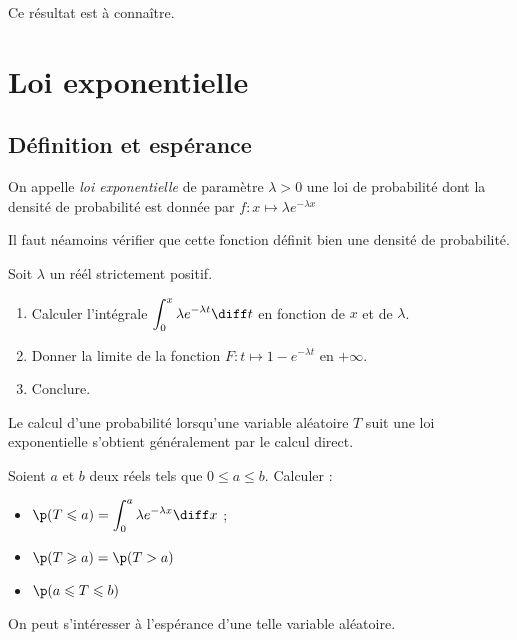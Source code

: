 \documentclass[12pt,a4paper,french]{article}
\begin{document}
Ce résultat est à connaître.

\pagebreak

\section{Loi exponentielle}

\subsection{Définition et espérance}

\begin{definition}
  On appelle \emph{loi exponentielle} de paramètre $\lambda>0$ une loi
  de probabilité dont la densité de probabilité est donnée par
  $f:x\mapsto \lambda e^{-\lambda x}$
\end{definition}

Il faut néamoins vérifier que cette fonction définit bien une densité de
probabilité.

\begin{question}
  Soit $\lambda$ un réél strictement positif.
  \begin{enumerate}
    \item Calculer l'intégrale $\displaystyle\int_0^x \lambda e^{-\lambda t}
      \diff t$ en fonction de $x$ et de $\lambda$.
    \item Donner la limite de la fonction $F:t \mapsto 1 - e^{-\lambda
      t}$ en $+\infty$.
    \item Conclure.
  \end{enumerate}
\end{question}

Le calcul d'une probabilité lorsqu'une variable aléatoire $T$ suit une
loi exponentielle s'obtient généralement par le calcul direct.

\begin{question}
  Soient $a$ et $b$ deux réels tels que $0\leqslant a \leqslant b$.
  Calculer :
  \begin{itemize}
    \item $\p(T \leqslant a) = \displaystyle\int_0^a \lambda e^{-\lambda x}
      \diff x$ ;
    \item $\p(T \geqslant a) = \p(T > a )$
    \item $\p(a \leqslant T \leqslant b)$
  \end{itemize}
\end{question}

On peut s'intéresser à l'espérance d'une telle variable aléatoire.
\end{document}
